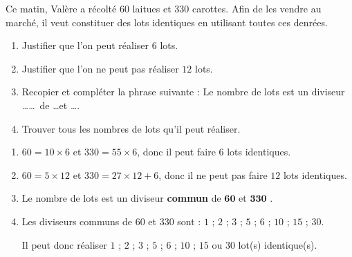 \begin{exercice*}
    Ce matin, Valère a récolté $60$ laitues et $330$ carottes. Afin de les vendre au marché, il veut
constituer des lots identiques en utilisant toutes ces denrées.
    \begin{enumerate}
        \item Justifier que l'on peut réaliser $6$ lots.
        \item Justifier que l'on ne peut pas réaliser $12$ lots.
        \item Recopier et compléter la phrase suivante : \og Le nombre de lots est un diviseur \dots\dots~de \dots et \dots .\fg
        \item Trouver tous les nombres de lots qu'il peut réaliser.
    \end{enumerate}

\end{exercice*}
\begin{corrige}
    \begin{enumerate}
        \item $60 = 10\times 6$ et $330 = 55\times 6$, donc il peut faire $6$ lots identiques.
        \item $60 = 5\times 12$ et $330 = 27\times 12 + 6$, donc il ne peut pas faire $12$ lots identiques.        
        \item \og Le nombre de lots est un diviseur \textbf{commun} de $\mathbf{60}$ et $\mathbf{330}$ .\fg
        \item Les diviseurs communs de $60$ et $330$ sont : $1$ ; $2$ ; $3$ ; $5$ ; $6$ ; $10$ ; $15$ ; $30$.
        
        Il peut donc réaliser $1$ ; $2$ ; $3$ ; $5$ ; $6$ ; $10$ ; $15$ ou $30$ lot(s) identique(s).
    \end{enumerate}
\end{corrige}

